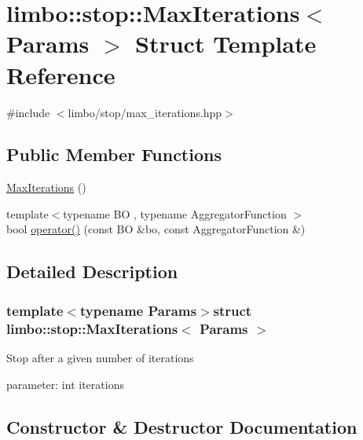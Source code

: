 \hypertarget{structlimbo_1_1stop_1_1_max_iterations}{}\section{limbo\+:\+:stop\+:\+:Max\+Iterations$<$ Params $>$ Struct Template Reference}
\label{structlimbo_1_1stop_1_1_max_iterations}


{\ttfamily \#include $<$limbo/stop/max\+\_\+iterations.\+hpp$>$}

\subsection*{Public Member Functions}
\begin{DoxyCompactItemize}
\item 
\hyperlink{structlimbo_1_1stop_1_1_max_iterations_a07bb1bbffe6b7374c9d1af7575dbc745}{Max\+Iterations} ()
\item 
{\footnotesize template$<$typename B\+O , typename Aggregator\+Function $>$ }\\bool \hyperlink{structlimbo_1_1stop_1_1_max_iterations_a357c80242e43d6cd25e48a63044bf2a2}{operator()} (const B\+O \&bo, const Aggregator\+Function \&)
\end{DoxyCompactItemize}


\subsection{Detailed Description}
\subsubsection*{template$<$typename Params$>$struct limbo\+::stop\+::\+Max\+Iterations$<$ Params $>$}

Stop after a given number of iterations

parameter\+: int iterations 

\subsection{Constructor \& Destructor Documentation}
\hypertarget{structlimbo_1_1stop_1_1_max_iterations_a07bb1bbffe6b7374c9d1af7575dbc745}{}
